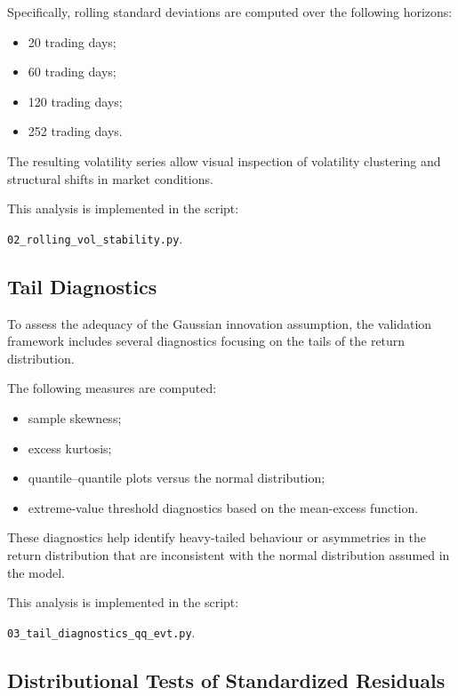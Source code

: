 Specifically, rolling standard deviations are computed over the following horizons:

\begin{itemize}
	
	\item 20 trading days;
	\item 60 trading days;
	\item 120 trading days;
	\item 252 trading days.
	
\end{itemize}

The resulting volatility series allow visual inspection of volatility clustering and structural shifts in market conditions.

This analysis is implemented in the script:

\texttt{02\_rolling\_vol\_stability.py}.

\subsection{Tail Diagnostics}

To assess the adequacy of the Gaussian innovation assumption, the validation framework includes several diagnostics focusing on the tails of the return distribution.

The following measures are computed:

\begin{itemize}
	
	\item sample skewness;
	\item excess kurtosis;
	\item quantile–quantile plots versus the normal distribution;
	\item extreme-value threshold diagnostics based on the mean-excess function.
	
\end{itemize}

These diagnostics help identify heavy-tailed behaviour or asymmetries in the return distribution that are inconsistent with the normal distribution assumed in the model.

This analysis is implemented in the script:

\texttt{03\_tail\_diagnostics\_qq\_evt.py}.

\subsection{Distributional Tests of Standardized Residuals}

